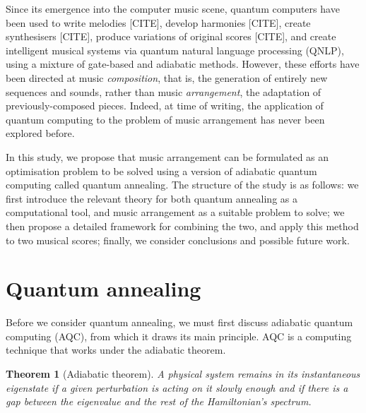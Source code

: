 \documentclass[12pt]{article}
\newtheorem*{theorem}{Theorem}
\theoremstyle{definition}
\begin{document}
Since its emergence into the computer music scene, quantum computers have been used to write melodies [CITE], develop harmonies [CITE], create synthesisers [CITE], produce variations of original scores [CITE], and create intelligent musical systems via quantum natural language processing (QNLP), using a mixture of gate-based and adiabatic methods. However, these efforts have been directed at music \emph{composition}, that is, the generation of entirely new sequences and sounds, rather than music \emph{arrangement}, the adaptation of previously-composed pieces. Indeed, at time of writing, the application of quantum computing to the problem of music arrangement has never been explored before.

In this study, we propose that music arrangement can be formulated as an optimisation problem to be solved using a version of adiabatic quantum computing called quantum annealing.
The structure of the study is as follows: we first introduce the relevant theory for both quantum annealing as a computational tool, and music arrangement as a suitable problem to solve; we then propose a detailed framework for combining the two, and apply this method to two musical scores; finally, we consider conclusions and possible future work.

\section{Quantum annealing}

Before we consider quantum annealing, we must first discuss adiabatic quantum computing (AQC), from which it draws its main principle. AQC is a computing technique that works under the adiabatic theorem.

\begin{theorem}[Adiabatic theorem]
    A physical system remains in its instantaneous eigenstate if a given perturbation is acting on it slowly enough and if there is a gap between the eigenvalue and the rest of the Hamiltonian's spectrum. \cite{born_beweis_1928}
\end{theorem}
\end{document}
